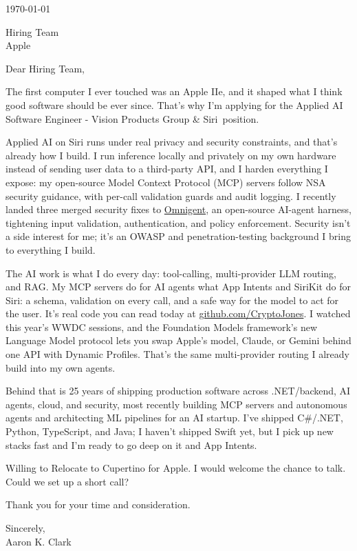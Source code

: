 \documentclass{resume}
\def\company{Apple}
\def\role{Applied AI Software Engineer - Vision Products Group \& Siri}
\def\manager{Hiring Team}          %
\begin{document}
\vspace{0.5em}
\today

\bigskip
\noindent \manager \\
\company

\bigskip
\noindent Dear \manager,

The first computer I ever touched was an Apple IIe, and it shaped what I think good software should be ever since. That's why I'm applying for the \role\ position.

Applied AI on Siri runs under real privacy and security constraints, and that's already how I build. I run inference locally and privately on my own hardware instead of sending user data to a third-party API, and I harden everything I expose: my open-source Model Context Protocol (MCP) servers follow NSA security guidance, with per-call validation guards and audit logging. I recently landed three merged security fixes to \href{https://github.com/omnigent-ai/omnigent}{Omnigent}, an open-source AI-agent harness, tightening input validation, authentication, and policy enforcement. Security isn't a side interest for me; it's an OWASP and penetration-testing background I bring to everything I build.

The AI work is what I do every day: tool-calling, multi-provider LLM routing, and RAG. My MCP servers do for AI agents what App Intents and SiriKit do for Siri: a schema, validation on every call, and a safe way for the model to act for the user. It's real code you can read today at \href{https://github.com/CryptoJones}{github.com/CryptoJones}. I watched this year's WWDC sessions, and the Foundation Models framework's new Language Model protocol lets you swap Apple's model, Claude, or Gemini behind one API with Dynamic Profiles. That's the same multi-provider routing I already build into my own agents.

Behind that is 25 years of shipping production software across .NET/backend, AI agents, cloud, and security, most recently building MCP servers and autonomous agents and architecting ML pipelines for an AI startup. I've shipped C\#/.NET, Python, TypeScript, and Java; I haven't shipped Swift yet, but I pick up new stacks fast and I'm ready to go deep on it and App Intents.

Willing to Relocate to Cupertino for Apple. I would welcome the chance to talk. Could we set up a short call?

\bigskip
\noindent Thank you for your time and consideration.

\bigskip
\noindent Sincerely, \\[1em]
Aaron K. Clark
\end{document}
